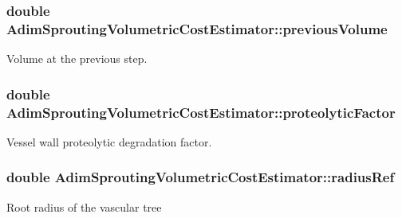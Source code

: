 \subsubsection[{\texorpdfstring{previous\+Volume}{previousVolume}}]{\setlength{\rightskip}{0pt plus 5cm}double Adim\+Sprouting\+Volumetric\+Cost\+Estimator\+::previous\+Volume\hspace{0.3cm}{\ttfamily [private]}}\hypertarget{class_adim_sprouting_volumetric_cost_estimator_abcacf4498f7210da6ff4f04cca3ab176}{}\label{class_adim_sprouting_volumetric_cost_estimator_abcacf4498f7210da6ff4f04cca3ab176}
Volume at the previous step. 
\subsubsection[{\texorpdfstring{proteolytic\+Factor}{proteolyticFactor}}]{\setlength{\rightskip}{0pt plus 5cm}double Adim\+Sprouting\+Volumetric\+Cost\+Estimator\+::proteolytic\+Factor\hspace{0.3cm}{\ttfamily [private]}}\hypertarget{class_adim_sprouting_volumetric_cost_estimator_ab8b8bfa47fa1e8283e9b1d9721d7cf29}{}\label{class_adim_sprouting_volumetric_cost_estimator_ab8b8bfa47fa1e8283e9b1d9721d7cf29}
Vessel wall proteolytic degradation factor. 
\subsubsection[{\texorpdfstring{radius\+Ref}{radiusRef}}]{\setlength{\rightskip}{0pt plus 5cm}double Adim\+Sprouting\+Volumetric\+Cost\+Estimator\+::radius\+Ref\hspace{0.3cm}{\ttfamily [private]}}\hypertarget{class_adim_sprouting_volumetric_cost_estimator_a8d3cdcd6ecf322c066cd6042279af68c}{}\label{class_adim_sprouting_volumetric_cost_estimator_a8d3cdcd6ecf322c066cd6042279af68c}
Root radius of the vascular tree 
